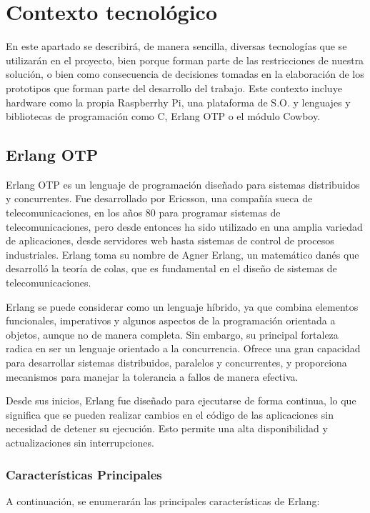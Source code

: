 \chapter{Contexto tecnológico}

En este apartado se describirá, de manera sencilla, diversas tecnologías que se utilizarán en el proyecto, bien porque forman parte de las restricciones de nuestra solución, o bien como consecuencia de decisiones tomadas en la elaboración de los prototipos que forman parte del desarrollo del trabajo.
Este contexto incluye hardware como la propia Raspberrhy Pi, una plataforma de S.O. y lenguajes y bibliotecas de programación como C, Erlang OTP o el módulo Cowboy.


\section{Erlang OTP}

Erlang OTP es un lenguaje de programación diseñado para sistemas distribuidos y concurrentes. Fue desarrollado por Ericsson, una compañía sueca de telecomunicaciones, en los años 80 para programar sistemas de telecomunicaciones, pero desde entonces ha sido utilizado en una amplia variedad de aplicaciones, desde servidores web hasta sistemas de control de procesos industriales. Erlang toma su nombre de Agner Erlang, un matemático danés que desarrolló la teoría de colas, que es fundamental en el diseño de sistemas de telecomunicaciones.

Erlang se puede considerar como un lenguaje híbrido, ya que combina elementos funcionales, imperativos y algunos aspectos de la programación orientada a objetos, aunque no de manera completa. Sin embargo, su principal fortaleza radica en ser un lenguaje orientado a la concurrencia. Ofrece una gran capacidad para desarrollar sistemas distribuidos, paralelos y concurrentes, y proporciona mecanismos para manejar la tolerancia a fallos de manera efectiva.

Desde sus inicios, Erlang fue diseñado para ejecutarse de forma continua, lo que significa que se pueden realizar cambios en el código de las aplicaciones sin necesidad de detener su ejecución. Esto permite una alta disponibilidad y actualizaciones sin interrupciones.
\newpage
\subsection{Características Principales}

A continuación, se enumerarán las principales características de Erlang:

